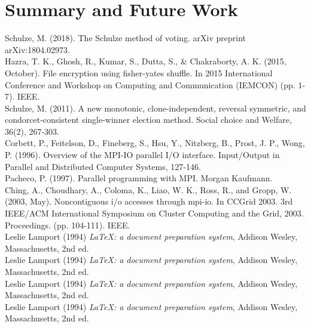 \documentclass[final,5p,times,twocolumn,authoryear, 10pt]{elsarticle}
\begin{document}
\section{Summary and Future Work}
\label{Summary and Future Work}



%  
% 


\begin{thebibliography}{20}

Schulze, M. (2018). The Schulze method of voting. arXiv preprint
arXiv:1804.02973. 
\\
Hazra, T. K., Ghosh, R., Kumar, S., Dutta, S., \& Chakraborty, A. K. (2015,
October). File encryption using fisher-yates shuffle. In 2015 International
Conference and Workshop on Computing and Communication (IEMCON) (pp. 1-7).
IEEE.
\\ 
Schulze, M. (2011). A new monotonic, clone-independent, reversal symmetric, and
condorcet-consistent single-winner election method. Social choice and Welfare,
36(2), 267-303.
\\
Corbett, P., Feitelson, D., Fineberg, S., Hsu, Y., Nitzberg, B., Prost, J. P.,
Wong, P. (1996). Overview of the MPI-IO parallel I/O interface. Input/Output in
Parallel and Distributed Computer Systems, 127-146.
\\
Pacheco, P. (1997). Parallel programming with MPI. Morgan Kaufmann.
\\
Ching, A., Choudhary, A., Coloma, K., Liao, W. K., Ross, R., and Gropp, W.
(2003, May). Noncontiguous i/o accesses through mpi-io. In CCGrid 2003. 3rd
IEEE/ACM International Symposium on Cluster Computing and the Grid, 2003.
Proceedings. (pp. 104-111). IEEE. \\

Leslie Lamport (1994) \emph{\LaTeX: a document preparation system}, Addison
Wesley, Massachusetts, 2nd ed.
\\
Leslie Lamport (1994) \emph{\LaTeX: a document preparation system}, Addison
Wesley, Massachusetts, 2nd ed.
\\
Leslie Lamport (1994) \emph{\LaTeX: a document preparation system}, Addison
Wesley, Massachusetts, 2nd ed.
\\
Leslie Lamport (1994) \emph{\LaTeX: a document preparation system}, Addison
Wesley, Massachusetts, 2nd ed.

\end{thebibliography}
\end{document}
